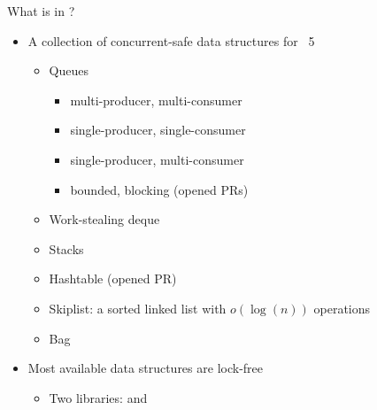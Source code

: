 \begin{frame}{What is in \Saturn ?}
    \begin{itemize}[label=$\bullet$]
        \item<1-> A collection of concurrent-safe data structures for \OCaml~5
        \begin{itemize}[label=$\diamond$]
            \item<2-> Queues
                \begin{itemize}[label=$\circ$]
                \item multi-producer, multi-consumer
                \item single-producer, single-consumer 
                \item single-producer, multi-consumer 
                \item bounded, blocking (opened PRs)
                \end{itemize}
            \item<3-> Work-stealing deque
            \item<3-> Stacks 
            \item<3-> Hashtable (opened PR)
            \item<3-> Skiplist: a sorted linked list with $o(\log(n))$ operations
            \item<3-> Bag
        \end{itemize}
        \item<4-> Most available data structures are lock-free 
        \begin{itemize}[label=$\rightarrow$]
            \item<5-> Two libraries: \Saturn and \Saturnlf
        \end{itemize}
    \end{itemize}
 \end{frame}



